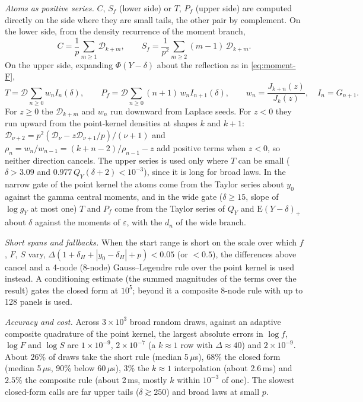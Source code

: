 \documentclass[12pt]{article}
\newcommand{\PhiN}{\Phi}
\begin{document}
\emph{Atoms as positive series.} $C$, $S_f$ (lower side) or $T$, $P_f$ (upper side) are computed directly on the side where they are small tails, the other pair by complement. On the lower side, from the density recurrence of the moment branch,
\begin{equation}
  C=\frac1p\sum_{m\ge1}\mathcal D_{k+m},\qquad
  S_f=\frac1{p^2}\sum_{m\ge2}(m-1)\,\mathcal D_{k+m}.
\end{equation}
On the upper side, expanding $\PhiN(Y-\delta)$ about the reflection as in
\eqref{eq:moment-F},
\begin{equation}
  T=\mathcal D\sum_{n\ge0}w_nI_n(\delta),\qquad
  P_f=\mathcal D\sum_{n\ge0}(n+1)\,w_nI_{n+1}(\delta),\qquad
  w_n=\frac{J_{k+n}(z)}{J_k(z)},\quad I_n=G_{n+1}.
\end{equation}
For $z\ge0$ the $\mathcal D_{k+m}$ and $w_n$ run downward from Laplace seeds. For $z<0$ they run upward from the point-kernel densities at shapes $k$ and $k+1$: $\mathcal D_{\nu+2}=p^2(\mathcal D_\nu-z\mathcal D_{\nu+1}/p)/(\nu+1)$ and $\rho_n=w_n/w_{n-1}=(k+n-2)/\rho_{n-1}-z$ add positive terms when $z<0$, so neither direction cancels. The upper series is used only where $T$ can be small ($\delta>3.09$ and $0.977\,Q_Y(\delta+2)<10^{-3}$), since it is long for broad laws. In the narrow gate of the point kernel the atoms come from the Taylor series about $y_0$ against the gamma central moments, and in the wide gate ($\delta\ge15$, slope of $\log g_Y$ at most one) $T$ and $P_f$ come from the Taylor series of $Q_Y$ and $\mathrm E(Y-\delta)_+$ about $\delta$ against the moments of $\varepsilon$, with the $d_n$ of the wide branch.

\emph{Short spans and fallbacks.} When the start range is short on the scale over which $f$, $F$, $S$ vary, $\Delta(1+\delta_H+|y_0-\delta_H|+p)<0.05$ (or $<0.5$), the differences above cancel and a 4-node (8-node) Gauss--Legendre rule over the point kernel is used instead. A conditioning estimate (the summed magnitudes of the terms over the result) gates the closed form at $10^5$; beyond it a composite 8-node rule with up to 128 panels is used.

\emph{Accuracy and cost.} Across $3\times10^3$ broad random draws, against an adaptive composite quadrature of the point kernel, the largest absolute errors in $\log f$, $\log F$ and $\log S$ are $1\times10^{-9}$, $2\times10^{-7}$ (a $k\approx1$ row with $\Delta\approx40$) and
$2\times10^{-9}$. About $26\%$ of draws take the short rule
(median 5\,$\mu$s), $68\%$ the closed form (median 5\,$\mu$s, 90\% below
60\,$\mu$s), $3\%$ the $k\approx1$ interpolation (about 2.6\,ms) and $2.5\%$
the composite rule (about 2\,ms, mostly $k$ within $10^{-3}$ of one). The slowest closed-form calls are far upper tails ($\delta\gtrsim250$) and broad laws at small $p$.
\end{document}

